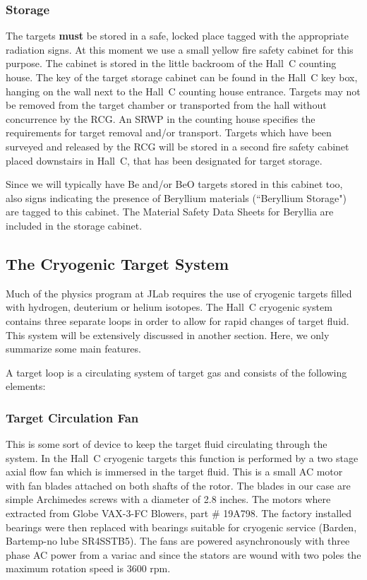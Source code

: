 \subsubsection{Storage}

The targets {\bf must} be stored in a safe, locked place tagged with the
appropriate radiation signs. At this moment we use a small yellow
fire safety cabinet for this purpose. The cabinet is stored in the
little backroom of the Hall~C counting house. The key of the target
storage cabinet can be found in the Hall~C key box, hanging on the
wall next to the Hall~C counting house entrance.
Targets may not be removed from the target chamber or transported from the hall without 
concurrence by the RCG.  An SRWP in the counting house specifies the requirements for 
target removal and/or transport.  Targets which have been surveyed and released by the 
RCG will be stored in a second fire safety cabinet placed downstairs in Hall~C,
that has been designated for target storage.

Since we will typically have
Be and/or BeO targets stored in this cabinet too, also signs indicating
the presence of Beryllium materials (``Beryllium Storage")
are tagged to this cabinet. The Material
Safety Data Sheets for Beryllia are included in the storage cabinet.


\subsection{The Cryogenic Target System}

Much of the physics program at JLab requires the use of cryogenic targets
filled with hydrogen, deuterium or helium isotopes. The Hall~C cryogenic
system contains three separate loops in order to allow for rapid changes
of target fluid.  This system will be extensively discussed in
another section.  Here, we only summarize some main features.

A target loop is a circulating system of target gas and consists of the following
elements:

\subsubsection{Target Circulation Fan} This is some sort of device to keep
the target fluid circulating through the system. In the Hall~C cryogenic
targets this function is performed by a two stage axial flow fan which is
immersed in the target fluid. This is a small AC motor with fan blades attached
on both shafts of the rotor. The blades in our case are simple Archimedes
screws with a diameter of 2.8 inches. The motors where extracted from Globe
VAX-3-FC Blowers, part $\#$ 19A798. The factory installed
bearings were then replaced with bearings suitable for cryogenic service
(Barden, Bartemp-no lube SR4SSTB5). The fans are powered asynchronously
with three phase AC power from a variac and since the stators are wound with
two poles the maximum rotation speed is 3600 rpm.
